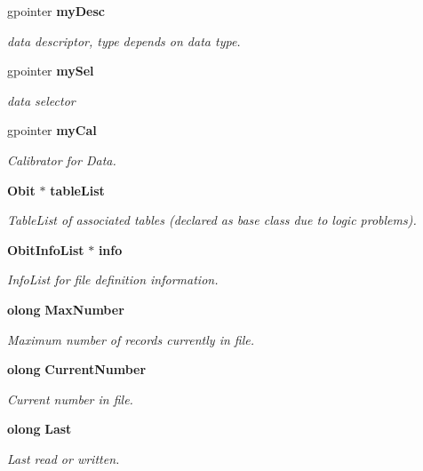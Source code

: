 \begin{CompactItemize}
gpointer {\bf my\-Desc}
\begin{CompactList}\small\item\em data descriptor, type depends on data type. \item\end{CompactList}\item 
gpointer {\bf my\-Sel}
\begin{CompactList}\small\item\em data selector \item\end{CompactList}\item 
gpointer {\bf my\-Cal}
\begin{CompactList}\small\item\em Calibrator for Data. \item\end{CompactList}\item 
{\bf Obit} $\ast$ {\bf table\-List}
\begin{CompactList}\small\item\em Table\-List of associated tables (declared as base class due to logic problems). \item\end{CompactList}\item 
{\bf Obit\-Info\-List} $\ast$ {\bf info}
\begin{CompactList}\small\item\em Info\-List for file definition information. \item\end{CompactList}\item 
{\bf olong} {\bf Max\-Number}
\begin{CompactList}\small\item\em Maximum number of records currently in file. \item\end{CompactList}\item 
{\bf olong} {\bf Current\-Number}
\begin{CompactList}\small\item\em Current number in file. \item\end{CompactList}\item 
{\bf olong} {\bf Last}
\begin{CompactList}\small\item\em Last read or written. \item\end{CompactList}\item 

\end{CompactItemize}
